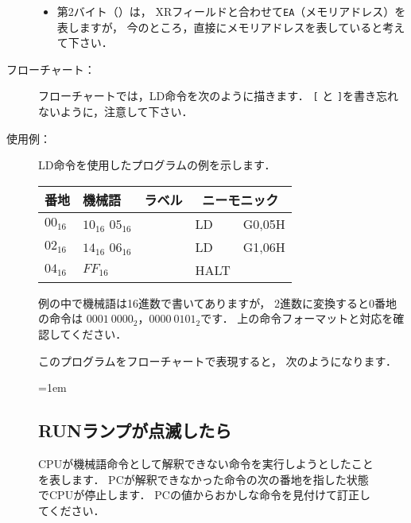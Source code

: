 \begin{description}
\begin{itemize}
  \item 第2バイト（\A）は，
    XRフィールドと合わせて\texttt{EA}（メモリアドレス）を表しますが，
    今のところ，直接にメモリアドレスを表していると考えて下さい．
  \end{itemize}

\item[フローチャート：]フローチャートでは，LD命令を次のように描きます．
  \texttt{[} と \texttt{]}を書き忘れないように，注意して下さい．

  \begin{center}
  \end{center}

\item[使用例：]LD命令を使用したプログラムの例を示します．

  {\ttfamily\small\begin{center}
    \begin{tabular}{|l|l|l|l l|} \hline
      番地 & 機械語 & ラベル & \multicolumn{2}{|c|}{ニーモニック} \\
      \hline
      $00_{16}$ & $10_{16}$ $05_{16}$ & & LD   & G0,05H \\
      $02_{16}$ & $14_{16}$ $06_{16}$ & & LD   & G1,06H \\
      $04_{16}$ & $FF_{16}$           & & HALT &       \\
      \hline
    \end{tabular}
  \end{center}}

  例の中で機械語は16進数で書いてありますが，
  2進数に変換すると0番地の命令は $0001~0000_2$，$0000~0101_2$です．
  上の命令フォーマットと対応を確認してください．

  このプログラムをフローチャートで表現すると，
  次のようになります．

  \begin{center}
  \end{center}
\end{description}

\begin{figure}[tbp]
  \begin{framed}{\parindent=1em
      \subsection*{RUNランプが点滅したら}
      CPUが機械語命令として解釈できない命令を実行しようとしたことを表します．
      PCが解釈できなかった命令の次の番地を指した状態でCPUが停止します．
      PCの値からおかしな命令を見付けて訂正してください．
  }\end{framed}
\end{figure}

